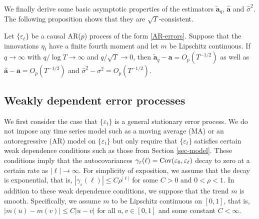 We finally derive some basic asymptotic properties of the estimators $\widetilde{\boldsymbol{a}}_q$, $\widehat{\boldsymbol{a}}$ and $\widehat{\sigma}^2$. The following proposition shows that they are $\sqrt{T}$-consistent. 
\begin{prop}\label{prop-lrv}
Let $\{\varepsilon_t\}$ be a causal AR($p$) process of the form \eqref{AR-errors}. Suppose that the innovations $\eta_t$ have a finite fourth moment and let $m$ be Lipschitz continuous. If $q \rightarrow \infty$ with $q/\log T \rightarrow \infty$ and $q/\sqrt{T} \rightarrow 0$, then $\widetilde{\boldsymbol{a}}_q - \boldsymbol{a} = O_p(T^{-1/2})$ as well as $\widehat{\boldsymbol{a}} - \boldsymbol{a} = O_p(T^{-1/2})$ and $\widehat{\sigma}^2 - \sigma^2 = O_p(T^{-1/2})$.
\end{prop}





\newpage
\subsection{Weakly dependent error processes}


We first consider the case that $\{ \varepsilon_t \}$ is a general stationary error process. We do not impose any time series model such as a moving average (MA) or an autoregressive (AR) model on $\{\varepsilon_t\}$ but only require that $\{\varepsilon_t\}$ satisfies certain weak dependence conditions such as those from Section \ref{sec-model}. These conditions imply that the autocovariances $\gamma_\varepsilon(\ell) = \textnormal{Cov}(\varepsilon_0,\varepsilon_{\ell})$ decay to zero at a certain rate as $|\ell| \rightarrow \infty$. For simplicity of exposition, we assume that the decay is exponential, that is, $|\gamma_\varepsilon(\ell)| \le C \rho^{|\ell|}$ for some $C > 0$ and $0 < \rho < 1$. In addition to these weak dependence conditions, we suppose that the trend $m$ is smooth. Specifically, we assume $m$ to be Lipschitz continuous on $[0,1]$, that is, $|m(u) - m(v)| \le C|u-v|$ for all $u,v \in [0,1]$ and some constant $C < \infty$. 


